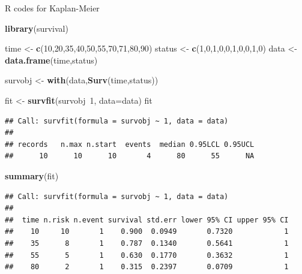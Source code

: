 \documentclass[ignorenonframetext,]{beamer}
\newenvironment{Shaded}{\begin{snugshade}}{\end{snugshade}}
\newcommand{\KeywordTok}[1]{\textcolor[rgb]{0.13,0.29,0.53}{\textbf{{#1}}}}
\newcommand{\DataTypeTok}[1]{\textcolor[rgb]{0.13,0.29,0.53}{{#1}}}
\newcommand{\DecValTok}[1]{\textcolor[rgb]{0.00,0.00,0.81}{{#1}}}
\newcommand{\StringTok}[1]{\textcolor[rgb]{0.31,0.60,0.02}{{#1}}}
\newcommand{\NormalTok}[1]{{#1}}
\begin{document}
\begin{frame}[fragile]{R codes for Kaplan-Meier}

\begin{Shaded}
\begin{Highlighting}[]
\KeywordTok{library}\NormalTok{(survival)}

\NormalTok{time <-}\StringTok{ }\KeywordTok{c}\NormalTok{(}\DecValTok{10}\NormalTok{,}\DecValTok{20}\NormalTok{,}\DecValTok{35}\NormalTok{,}\DecValTok{40}\NormalTok{,}\DecValTok{50}\NormalTok{,}\DecValTok{55}\NormalTok{,}\DecValTok{70}\NormalTok{,}\DecValTok{71}\NormalTok{,}\DecValTok{80}\NormalTok{,}\DecValTok{90}\NormalTok{)}
\NormalTok{status <-}\StringTok{ }\KeywordTok{c}\NormalTok{(}\DecValTok{1}\NormalTok{,}\DecValTok{0}\NormalTok{,}\DecValTok{1}\NormalTok{,}\DecValTok{0}\NormalTok{,}\DecValTok{0}\NormalTok{,}\DecValTok{1}\NormalTok{,}\DecValTok{0}\NormalTok{,}\DecValTok{0}\NormalTok{,}\DecValTok{1}\NormalTok{,}\DecValTok{0}\NormalTok{)}
\NormalTok{data <-}\StringTok{ }\KeywordTok{data.frame}\NormalTok{(time,status)}

\NormalTok{survobj <-}\StringTok{ }\KeywordTok{with}\NormalTok{(data,}\KeywordTok{Surv}\NormalTok{(time,status))}

\NormalTok{fit <-}\StringTok{ }\KeywordTok{survfit}\NormalTok{(survobj~}\DecValTok{1}\NormalTok{, }\DataTypeTok{data=}\NormalTok{data)}
\NormalTok{fit}
\end{Highlighting}
\end{Shaded}

\begin{verbatim}
## Call: survfit(formula = survobj ~ 1, data = data)
## 
## records   n.max n.start  events  median 0.95LCL 0.95UCL 
##      10      10      10       4      80      55      NA
\end{verbatim}

\begin{Shaded}
\begin{Highlighting}[]
\KeywordTok{summary}\NormalTok{(fit)}
\end{Highlighting}
\end{Shaded}

\begin{verbatim}
## Call: survfit(formula = survobj ~ 1, data = data)
## 
##  time n.risk n.event survival std.err lower 95% CI upper 95% CI
##    10     10       1    0.900  0.0949       0.7320            1
##    35      8       1    0.787  0.1340       0.5641            1
##    55      5       1    0.630  0.1770       0.3632            1
##    80      2       1    0.315  0.2397       0.0709            1
\end{verbatim}


\end{frame}
\end{document}
